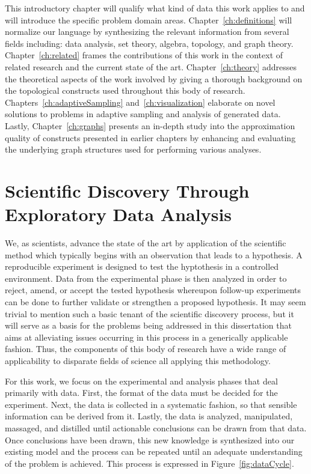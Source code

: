 This introductory chapter will qualify what kind of data this work applies to and will introduce the specific problem domain areas.
%
Chapter~\ref{ch:definitions} will normalize our language by synthesizing the relevant information from several fields including: data analysis, set theory, algebra, topology, and graph theory.
%
Chapter~\ref{ch:related} frames the contributions of this work in the context of related research and the current state of the art.
%
Chapter~\ref{ch:theory} addresses the theoretical aspects of the work involved by giving a thorough background on the topological constructs used throughout this body of research.
%
Chapters~\ref{ch:adaptiveSampling} and~\ref{ch:visualization} elaborate on novel solutions to problems in adaptive sampling and analysis of generated data.
%
Lastly, Chapter~\ref{ch:graphs} presents an in-depth study into the approximation quality of constructs presented in earlier chapters by enhancing and evaluating the underlying graph structures used for performing various analyses.

\section{Scientific Discovery Through Exploratory Data Analysis}

We, as scientists, advance the state of the art by application of the scientific method which typically begins with an observation that leads to a hypothesis.
%
A reproducible experiment is designed to test the hyptothesis in a controlled environment.
%
Data from the experimental phase is then analyzed in order to reject, amend, or accept the tested hypothesis whereupon follow-up experiments can be done to further validate or strengthen a proposed hypothesis.
%
It may seem trivial to mention such a basic tenant of the scientific discovery process, but it will serve as a basis for the problems being addressed in this dissertation that aims at alleviating issues occurring in this  process in a generically applicable fashion.
%
Thus, the components of this body of research have a wide range of applicability to disparate fields of science all applying this methodology.

For this work, we focus on the experimental and analysis phases that deal primarily with data.
%
First, the format of the data must be decided for the experiment.
%
Next, the data is collected in a systematic fashion, so that sensible information can be derived from it.
%
Lastly, the data is analyzed, manipulated, massaged, and distilled until actionable conclusions can be drawn from that data.
%
Once conclusions have been drawn, this new knowledge is synthesized into our existing model and the process can be repeated until an adequate understanding of the problem is achieved.
%
This process is expressed in Figure~\ref{fig:dataCycle}.

